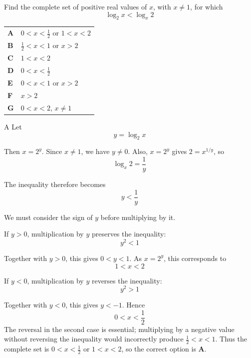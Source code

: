 \documentclass[11pt,a4paper]{article}
\begin{document}
\thispagestyle{djssolutions}
\djsFrontMatter
\clearpage
\thispagestyle{djssolutions}
\vspace*{8pt}
\begin{enumerate}[label=\textbf{\arabic*.},leftmargin=*,itemsep=0pt,start=1]
Find the complete set of positive real values of $x$, with $x \neq 1$, for which\[\log_2 x < \log_x 2\]

\par\vspace*{12pt}
\begin{tabularx}{\linewidth}{@{}>{\bfseries}l Y@{}}
A &
$0<x<\frac{1}{2}$ or $1<x<2$
\\[0.8em]
B &
$\frac{1}{2}<x<1$ or $x>2$
\\[0.8em]
C &
$1<x<2$
\\[0.8em]
D &
$0<x<\frac{1}{2}$
\\[0.8em]
E &
$0<x<1$ or $x>2$
\\[0.8em]
F &
$x>2$
\\[0.8em]
G &
$0<x<2$, $x \neq 1$
\\
\end{tabularx}

\begin{djsSolution}{A}
Let
\[
y=\log_2 x
\]

Then $x=2^y$. Since $x\ne 1$, we have $y\ne 0$. Also, $x=2^y$ gives $2=x^{1/y}$, so
\[
\log_x 2=\frac{1}{y}
\]

The inequality therefore becomes
\[
y<\frac{1}{y}
\]

We must consider the sign of $y$ before multiplying by it.

If $y>0$, multiplication by $y$ preserves the inequality:
\[
y^2<1
\]

Together with $y>0$, this gives $0<y<1$. As $x=2^y$, this corresponds to
\[
1<x<2
\]

If $y<0$, multiplication by $y$ reverses the inequality:
\[
y^2>1
\]

Together with $y<0$, this gives $y<-1$. Hence
\[
0<x<\frac12
\]
The reversal in the second case is essential; multiplying by a negative value without reversing the inequality would incorrectly produce $\frac12<x<1$.
Thus the complete set is $0<x<\frac12$ or $1<x<2$, so the correct option is \textbf{A}. \\[5pt]


\end{djsSolution}
\end{enumerate}
\end{document}
